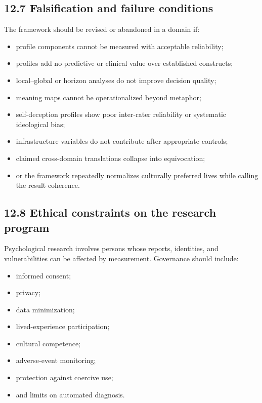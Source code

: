 \documentclass[
  11pt,
]{article}
\providecommand{\tightlist}{%
  \setlength{\itemsep}{0pt}\setlength{\parskip}{0pt}}
\begin{document}
\subsection{12.7 Falsification and failure
conditions}\label{falsification-and-failure-conditions}

The framework should be revised or abandoned in a domain if:

\begin{itemize}
\tightlist
\item
  profile components cannot be measured with acceptable reliability;
\item
  profiles add no predictive or clinical value over established
  constructs;
\item
  local--global or horizon analyses do not improve decision quality;
\item
  meaning maps cannot be operationalized beyond metaphor;
\item
  self-deception profiles show poor inter-rater reliability or
  systematic ideological bias;
\item
  infrastructure variables do not contribute after appropriate controls;
\item
  claimed cross-domain translations collapse into equivocation;
\item
  or the framework repeatedly normalizes culturally preferred lives
  while calling the result coherence.
\end{itemize}

\subsection{12.8 Ethical constraints on the research
program}\label{ethical-constraints-on-the-research-program}

Psychological research involves persons whose reports, identities, and
vulnerabilities can be affected by measurement. Governance should
include:

\begin{itemize}
\tightlist
\item
  informed consent;
\item
  privacy;
\item
  data minimization;
\item
  lived-experience participation;
\item
  cultural competence;
\item
  adverse-event monitoring;
\item
  protection against coercive use;
\item
  and limits on automated diagnosis.
\end{itemize}
\end{document}
